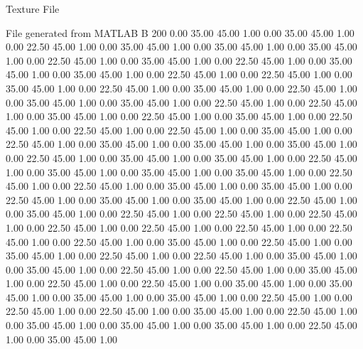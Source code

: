 Texture File

File generated from MATLAB
B 200
   0.00   35.00   45.00   1.00
   0.00   35.00   45.00   1.00
   0.00   22.50   45.00   1.00
   0.00   35.00   45.00   1.00
   0.00   35.00   45.00   1.00
   0.00   35.00   45.00   1.00
   0.00   22.50   45.00   1.00
   0.00   35.00   45.00   1.00
   0.00   22.50   45.00   1.00
   0.00   35.00   45.00   1.00
   0.00   35.00   45.00   1.00
   0.00   22.50   45.00   1.00
   0.00   22.50   45.00   1.00
   0.00   35.00   45.00   1.00
   0.00   22.50   45.00   1.00
   0.00   35.00   45.00   1.00
   0.00   22.50   45.00   1.00
   0.00   35.00   45.00   1.00
   0.00   35.00   45.00   1.00
   0.00   22.50   45.00   1.00
   0.00   22.50   45.00   1.00
   0.00   35.00   45.00   1.00
   0.00   22.50   45.00   1.00
   0.00   35.00   45.00   1.00
   0.00   22.50   45.00   1.00
   0.00   22.50   45.00   1.00
   0.00   22.50   45.00   1.00
   0.00   35.00   45.00   1.00
   0.00   22.50   45.00   1.00
   0.00   35.00   45.00   1.00
   0.00   35.00   45.00   1.00
   0.00   35.00   45.00   1.00
   0.00   22.50   45.00   1.00
   0.00   35.00   45.00   1.00
   0.00   35.00   45.00   1.00
   0.00   22.50   45.00   1.00
   0.00   35.00   45.00   1.00
   0.00   35.00   45.00   1.00
   0.00   35.00   45.00   1.00
   0.00   22.50   45.00   1.00
   0.00   22.50   45.00   1.00
   0.00   35.00   45.00   1.00
   0.00   35.00   45.00   1.00
   0.00   22.50   45.00   1.00
   0.00   35.00   45.00   1.00
   0.00   35.00   45.00   1.00
   0.00   22.50   45.00   1.00
   0.00   35.00   45.00   1.00
   0.00   22.50   45.00   1.00
   0.00   22.50   45.00   1.00
   0.00   22.50   45.00   1.00
   0.00   22.50   45.00   1.00
   0.00   22.50   45.00   1.00
   0.00   22.50   45.00   1.00
   0.00   22.50   45.00   1.00
   0.00   22.50   45.00   1.00
   0.00   35.00   45.00   1.00
   0.00   22.50   45.00   1.00
   0.00   35.00   45.00   1.00
   0.00   22.50   45.00   1.00
   0.00   22.50   45.00   1.00
   0.00   35.00   45.00   1.00
   0.00   35.00   45.00   1.00
   0.00   22.50   45.00   1.00
   0.00   22.50   45.00   1.00
   0.00   35.00   45.00   1.00
   0.00   22.50   45.00   1.00
   0.00   22.50   45.00   1.00
   0.00   35.00   45.00   1.00
   0.00   35.00   45.00   1.00
   0.00   35.00   45.00   1.00
   0.00   35.00   45.00   1.00
   0.00   22.50   45.00   1.00
   0.00   22.50   45.00   1.00
   0.00   22.50   45.00   1.00
   0.00   35.00   45.00   1.00
   0.00   22.50   45.00   1.00
   0.00   35.00   45.00   1.00
   0.00   35.00   45.00   1.00
   0.00   35.00   45.00   1.00
   0.00   22.50   45.00   1.00
   0.00   35.00   45.00   1.00
